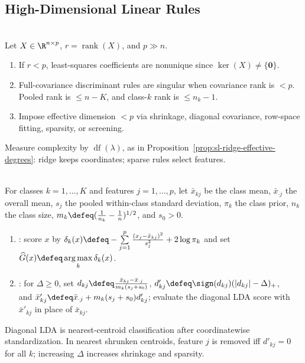 \subsection{High-Dimensional Linear Rules}

\begin{principle} \label{prin:sl-high-dimensional-less-fitting} \\
Let $X\in\R^{n\times p}$, $r=\operatorname{rank}(X)$, and $p\gg n$.
\begin{enumerate}[label=(\roman*)]
\setlength{\itemsep}{0pt}
\item If $r<p$, least-squares coefficients are nonunique since $\ker(X)\neq\{\mathbf{0}\}$.
\item Full-covariance discriminant rules are singular when covariance rank is $<p$.\\
Pooled rank is $\leq n-K$, and class-$k$ rank is $\leq n_k-1$.
\item Impose effective dimension $<p$ via shrinkage, diagonal covariance, row-space fitting, sparsity, or screening.
\end{enumerate}
Measure complexity by $\operatorname{df}(\lambda)$, as in Proposition~\ref{prop:sl-ridge-effective-degrees}: ridge keeps coordinates; sparse rules select features.
\end{principle}

\begin{method} \label{meth:sl-diagonal-lda-nearest-shrunken-centroids} \\
For classes $k=1,\ldots,K$ and features $j=1,\ldots,p$, let $\bar{x}_{kj}$ be the class mean, $\bar{x}_{\cdot j}$ the overall mean, $s_j$ the pooled within-class standard deviation, $\pi_k$ the class prior, $n_k$ the class size, $m_k\defeq(\frac{1}{n_k}-\frac{1}{n})^{1/2}$, and $s_0>0$.
\begin{enumerate}[label=(\roman*)]
\setlength{\itemsep}{0pt}
\item {}: score $x$ by $\delta_k(x)\defeq-\sum\limits_{j=1}^p \frac{(x_j-\bar{x}_{kj})^2}{s_j^2}+2\log\pi_k$ and set $\widehat{G}(x)\defeq\operatorname*{arg\,max}\limits_k\delta_k(x)$.
\item {}: for $\Delta\geq0$, set $d_{kj}\defeq\frac{\bar{x}_{kj}-\bar{x}_{\cdot j}}{m_k(s_j+s_0)}$, $d'_{kj}\defeq\sign(d_{kj})(|d_{kj}|-\Delta)_+$,\\
and $\bar{x}'_{kj}\defeq\bar{x}_{\cdot j}+m_k(s_j+s_0)d'_{kj}$; evaluate the diagonal LDA score with $\bar{x}'_{kj}$ in place of $\bar{x}_{kj}$.
\end{enumerate}
Diagonal LDA is nearest-centroid classification after coordinatewise standardization. In nearest shrunken centroids, feature $j$ is removed iff $d'_{kj}=0$ for all $k$; increasing $\Delta$ increases shrinkage and sparsity.
\end{method}

